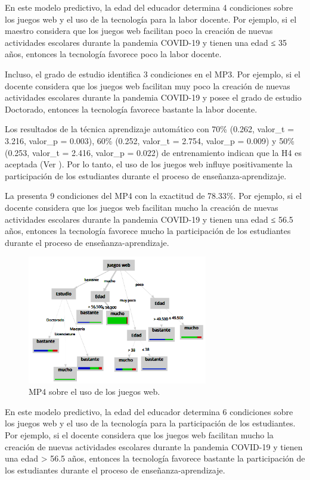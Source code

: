 \documentclass[spanish]{textolivre}
\begin{document}
En este modelo predictivo, la edad del educador determina 4 condiciones sobre los juegos web y el uso de la tecnología para la labor docente. Por ejemplo, si el maestro considera que los juegos web facilitan poco la creación de nuevas actividades escolares durante la pandemia COVID-19 y tienen una edad ≤ 35 años, entonces la tecnología favorece poco la labor docente.

Incluso, el grado de estudio identifica 3 condiciones en el MP3. Por ejemplo, si el docente considera que los juegos web facilitan muy poco la creación de nuevas actividades escolares durante la pandemia COVID-19 y posee el grado de estudio Doctorado, entonces la tecnología favorece bastante la labor docente.

Los resultados de la técnica aprendizaje automático con 70\% (0.262, valor\_t = 3.216, valor\_p = 0.003), 60\% (0.252, valor\_t = 2.754, valor\_p = 0.009) y 50\% (0.253, valor\_t = 2.416, valor\_p = 0.022) de entrenamiento indican que la H4 es aceptada (Ver ). Por lo tanto, el uso de los juegos web influye positivamente la participación de los estudiantes durante el proceso de enseñanza-aprendizaje.

La  presenta 9 condiciones del MP4 con la exactitud de 78.33\%. Por ejemplo, si el docente considera que los juegos web facilitan mucho la creación de nuevas actividades escolares durante la pandemia COVID-19 y tienen una edad ≤ 56.5 años, entonces la tecnología favorece mucho la participación de los estudiantes durante el proceso de enseñanza-aprendizaje.

\begin{figure}[htbp]
 \centering
 \includegraphics[width=0.7\textwidth]{37074-pag7.png}
 \caption{MP4 sobre el uso de los juegos web.}
 \label{fig7}
\end{figure}

En este modelo predictivo, la edad del educador determina 6 condiciones sobre los juegos web y el uso de la tecnología para la participación de los estudiantes. Por ejemplo, si el docente considera que los juegos web facilitan mucho la creación de nuevas actividades escolares durante la pandemia COVID-19 y tienen una edad > 56.5 años, entonces la tecnología favorece bastante la participación de los estudiantes durante el proceso de enseñanza-aprendizaje.
\end{document}
